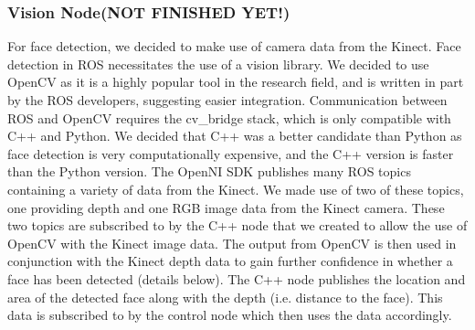 \documentclass[conference]{IEEEtran}
\begin{document}
\subsubsection{Vision Node\textbf{(NOT FINISHED YET!)}}
For face detection, we decided to make use of camera data from the Kinect. Face detection in ROS necessitates the use of a vision library. We decided to use OpenCV as it is a highly popular tool in the research field, and is written in part by the ROS developers, suggesting easier integration. Communication between ROS and OpenCV requires the cv\_bridge stack, which is only compatible with C++ and Python. We decided that C++ was a better candidate than Python as face detection is very computationally expensive, and the C++ version is faster than the Python version.
The OpenNI SDK publishes many ROS topics containing a variety of data from the Kinect. We made use of two of these topics, one providing depth and one RGB image data from the Kinect camera. These two topics are subscribed to by the C++ node that we created to allow the use of OpenCV with the Kinect image data. The output from OpenCV is then used in conjunction with the Kinect depth data to gain further confidence in whether a face has been detected (details below). The C++ node publishes the location and area of the detected face along with the depth (i.e. distance to the face). This data is subscribed to by the control node which then uses the data accordingly.
\end{document}
